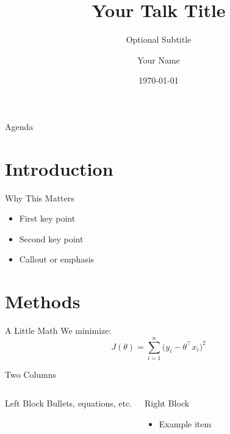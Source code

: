 \documentclass[aspectratio=169,11pt]{beamer}
\title[Short Title]{Your Talk Title}
\subtitle{Optional Subtitle}
\author{Your Name}
\institute{Your Organization}
\date{\today}
\begin{document}
\begin{frame}
  \titlepage
\end{frame}

\begin{frame}{Agenda}
  \tableofcontents
\end{frame}

\section{Introduction}
\begin{frame}{Why This Matters}
  \begin{itemize}
    \item First key point
    \item Second key point \pause
    \item \alert{Callout or emphasis}
  \end{itemize}
\end{frame}

\section{Methods}
\begin{frame}{A Little Math}
  We minimize:
  \[
    J(\theta)=\sum_{i=1}^{n}\big(y_i - \theta^\top x_i\big)^2
  \]
\end{frame}

\begin{frame}{Two Columns}
  \begin{columns}[T,totalwidth=\textwidth]
      \begin{block}{Left Block}
        Bullets, equations, etc.
      \end{block}
      \begin{exampleblock}{Right Block}
        \begin{itemize}
          \item Example item
        \end{itemize}
      \end{exampleblock}
  \end{columns}
\end{frame}


                    
\end{document}
